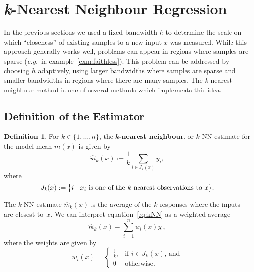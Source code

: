 \documentclass[
  a4paper,
]{article}
\theoremstyle{definition}
\newtheorem{definition}{Definition}[section]
\theoremstyle{definition}
\theoremstyle{definition}
\theoremstyle{definition}
\theoremstyle{remark}
\begin{document}
\clearpage

\section{\texorpdfstring{\emph{k}-Nearest Neighbour Regression}{k-Nearest Neighbour Regression}}\label{X07-nearest}

In the previous sections we used a fixed bandwidth \(h\) to determine the
scale on which ``closeness'' of existing samples to a new input \(x\) was
measured. While this approach generally works well, problems can appear
in regions where samples are sparse (\emph{e.g.}~in
example~\ref{exm:faithless}). This problem can be addressed by choosing
\(h\) adaptively, using larger bandwidths where samples are sparse and
smaller bandwidths in regions where there are many samples. The
\(k\)-nearest neighbour method is one of several methods which implements
this idea.

\subsection{Definition of the Estimator}\label{definition-of-the-estimator}

\begin{definition}
For \(k \in \{1, \ldots, n\}\), the \textbf{\emph{k}-nearest neighbour}, or
\(k\)-NN estimate for the model mean \(m(x)\) is given by
\begin{equation}
  \hat m_k(x)
  := \frac1k \sum_{i\in J_k(x)} y_i,  \label{eq:kNN}
\end{equation}
where
\begin{equation*}
  J_k(x)
  := \bigl\{ i \bigm| \mbox{$x_i$ is one of the $k$ nearest observations to $x$} \bigr\}.
\end{equation*}
\end{definition}

The \(k\)-NN estimate \(\hat m_k(x)\) is the average of the \(k\) responses
where the inputs are closest to~\(x\). We can interpret
equation~\eqref{eq:kNN} as a weighted average \begin{equation*}
  \hat m_k(x)
  = \sum_{i=1}^n w_i(x) y_i,
\end{equation*} where the weights are given by \begin{equation*}
  w_i(x)
  = \begin{cases}
      \frac1k, & \mbox{if $i \in J_k(x)$, and} \\
      0 & \mbox{otherwise.}
  \end{cases}
\end{equation*}
\end{document}
